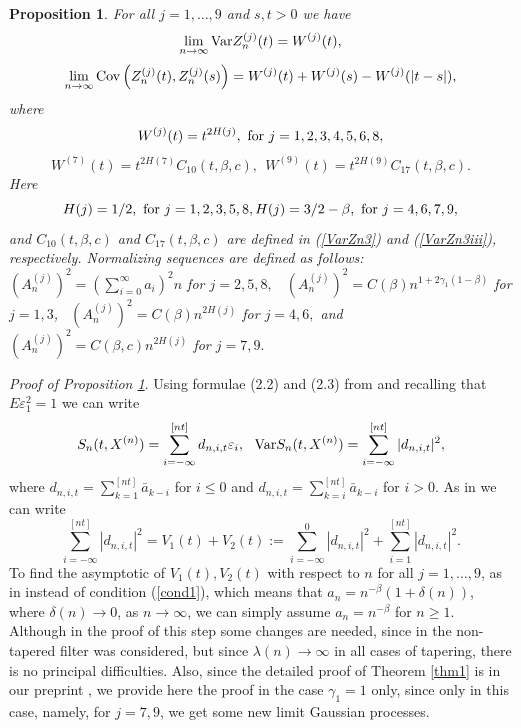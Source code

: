 \documentclass[12pt]{article}
\def\b{\beta}
\def\d{\delta}
\def\e{\varepsilon}
\def\g{\gamma}
\def\l{\lambda}
\theoremstyle{plain}
\newtheorem{prop}[teo]{Proposition}
\theoremstyle{definition}
\begin{document}
\begin{prop}\label{prop1} For all $j=1,\dots , 9$ and $s, t >0$ we have
\begin{equation*}\label{VarZnfinal}
\lim_{n\to \infty}{\rm Var}Z_n^{(j)}(t)= W^{(j)}(t),
\end{equation*}
\begin{equation*}\label{CovZnfinal}
\lim_{n\to \infty}{\rm Cov}\left (Z_n^{(j)}(t), Z_n^{(j)}(s)\right )= W^{(j)}(t)+W^{(j)}(s)-W^{(j)}(|t-s|),
\end{equation*}
where
$$
W^{(j)}(t)= t^{2H(j)}, \ {\rm for} \  j=1, 2, 3, 4, 5, 6, 8,
$$
$$
W^{(7)}(t)= t^{2H(7)}C_{10}(t, \b, c), \ \ W^{(9)}(t)= t^{2H(9)}C_{17}(t, \b, c).
$$
Here
$$
H(j)=1/2,\ {\rm for} \  j=1, 2, 3,  5,  8, H(j)=3/2-\b, \ {\rm for} \  j=4, 6, 7, 9,
$$
 and $C_{10}(t, \b, c)$ and  $C_{17}(t, \b, c)$ are defined in (\ref{VarZn3}) and (\ref{VarZn3iii}), respectively. Normalizing sequences are defined as follows: $(A_n^{(j)})^2=\left (\sum_{i=0}^\infty a_{i} \right )^2 n$ for $j=2, 5, 8,$ \ $(A_n^{(j)})^2= C(\b)n^{1+2\g_1(1-\b)}$ for $j=1, 3$, \ $(A_n^{(j)})^2= C(\b)n^{2H(j)}$ for $j=4, 6,$ and \ $(A_n^{(j)})^2= C(\b, c)n^{2H(j)}$ for $j=7, 9.$
\end{prop}

{\it Proof of Proposition \ref{prop1}}.
Using formulae (2.2) and (2.3) from \cite{Paul21} and recalling that $E\e_1^2=1$  we can write
$$%
S_n(t, X^{(n)})=\sum_{i=-\infty}^{[nt]} d_{n,i,t}\e_{i}, \ \ {\rm Var}S_n(t, X^{(n)})=\sum_{i=-\infty}^{[nt]}| d_{n,i,t}|^2,
$$%
where  $d_{n,i,t}=\sum_{k=1}^{[nt]}{\bar a}_{k-i}$ for $i\le 0$ and $d_{n,i,t}=\sum_{k=i}^{[nt]}{\bar a}_{k-i}$ for $i> 0$. As in \cite{Paul21} we can write
\begin{equation*}\label{sumdnj}
\sum_{i=-\infty}^{[nt]} |d_{n,i,t}|^2=V_1(t) +V_2(t):=\sum_{i=-\infty}^0 |d_{n,i,t}|^2 + \sum_{i=1}^{[nt]} |d_{n,i,t}|^2.
\end{equation*}
To find the asymptotic of $V_1(t), V_2(t)$ with respect to $n$ for all $j=1,\dots , 9$, as in \cite{Paul21} instead of condition (\ref{cond1}), which means that $a_n=n^{-\b}(1+\d(n))$, where $\d(n)\to 0$, as $n\to \infty$, we can simply assume $a_n=n^{-\b}$ for $n\ge 1$. Although in the proof of this step some changes are needed, since in \cite{Paul21} the non-tapered filter was considered, but since $\l(n)\to \infty$ in all cases of tapering, there is no principal difficulties. Also, since the detailed proof of Theorem \ref{thm1} is in our preprint \cite{Paul24}, we provide here the proof in the case $\g_1=1$ only, since only in this  case, namely, for $j=7, 9$, we get some new limit Gaussian processes. %
\end{document}
